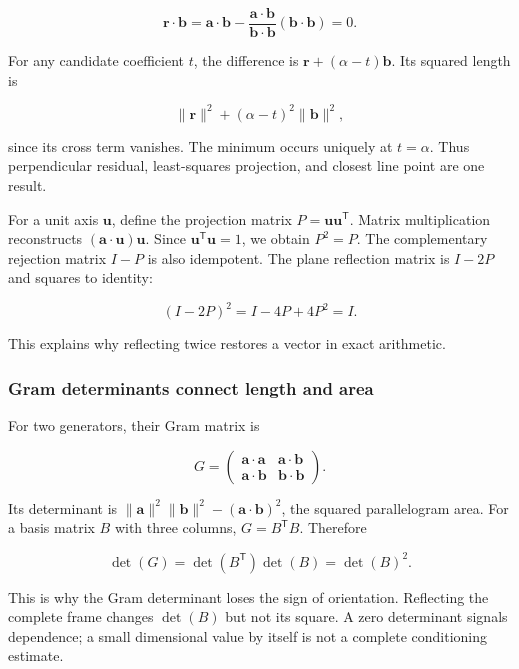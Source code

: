 \[
\mathbf r\cdot\mathbf b=\mathbf a\cdot\mathbf b-
\frac{\mathbf a\cdot\mathbf b}{\mathbf b\cdot\mathbf b}(\mathbf b\cdot\mathbf b)=0.
\]

For any candidate coefficient \(t\), the difference is \(\mathbf r+(\alpha-t)\mathbf b\). Its squared length is

\[
\|\mathbf r\|^2+(\alpha-t)^2\|\mathbf b\|^2,
\]

since its cross term vanishes. The minimum occurs uniquely at \(t=\alpha\). Thus perpendicular residual, least-squares projection, and closest line point are one result.

For a unit axis \(\mathbf u\), define the projection matrix \(P=\mathbf u\mathbf u^\mathsf T\). Matrix multiplication reconstructs \((\mathbf a\cdot\mathbf u)\mathbf u\). Since \(\mathbf u^\mathsf T\mathbf u=1\), we obtain \(P^2=P\). The complementary rejection matrix \(I-P\) is also idempotent. The plane reflection matrix is \(I-2P\) and squares to identity:

\[
(I-2P)^2=I-4P+4P^2=I.
\]

This explains why reflecting twice restores a vector in exact arithmetic.

\subsubsection{Gram determinants connect length and area}\label{02-foundations-ii-ch039-gram-determinants-connect-length-and-area}

\hypertarget{02-foundations-ii-ch039-gram-determinants-connect-length-and-area}{}

For two generators, their Gram matrix is

\[
G=\begin{pmatrix}\mathbf a\cdot\mathbf a&\mathbf a\cdot\mathbf b\\
\mathbf a\cdot\mathbf b&\mathbf b\cdot\mathbf b\end{pmatrix}.
\]

Its determinant is \(\|\mathbf a\|^2\|\mathbf b\|^2-(\mathbf a\cdot\mathbf b)^2\), the squared parallelogram area. For a basis matrix \(B\) with three columns, \(G=B^\mathsf TB\). Therefore

\[
\det(G)=\det(B^\mathsf T)\det(B)=\det(B)^2.
\]

This is why the Gram determinant loses the sign of orientation. Reflecting the complete frame changes \(\det(B)\) but not its square. A zero determinant signals dependence; a small dimensional value by itself is not a complete conditioning estimate.

